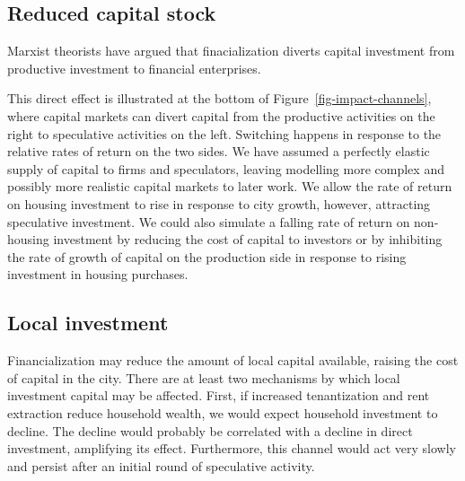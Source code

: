 
\subsection{Reduced capital stock}

Marxist theorists \cite{lefebvreRevolutionUrbaine1970, harveyClassmonopolyRentFinance1974, harveyUrbanProcessCapitalism1978, christophersRevisitingUrbanizationCapital2011} have argued that finacialization diverts capital investment from productive investment to financial enterprises. 

This direct effect is illustrated at the bottom of Figure~\ref{fig-impact-channels}, where capital markets can divert capital from the productive activities on the right to speculative activities on the left.  Switching happens in response to the relative rates of return on the two sides. We have assumed a perfectly elastic supply of capital to firms and speculators, leaving modelling more complex and possibly more realistic capital markets to later work.  We allow the rate of return on housing investment to rise in response to city growth, however, attracting speculative investment. We could also simulate a falling rate of return on non-housing investment by reducing the cost of capital to investors or by inhibiting the rate of growth of capital on the production side in response to rising investment in housing purchases. %


\subsection{Local investment}

Financialization may reduce the amount of local capital available, raising the cost of capital in the city. 
There are at least two mechanisms by which local investment capital may be affected. First, if increased tenantization and rent extraction reduce household wealth, we would expect household investment to decline. The decline would probably be correlated with a decline in direct investment, amplifying its effect. Furthermore, this channel would act very slowly and persist after an initial round of speculative activity. 

